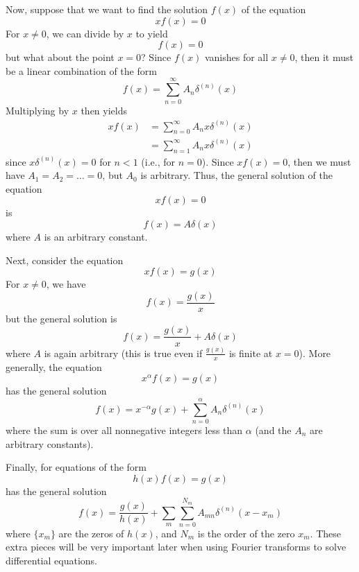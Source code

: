 Now, suppose that we want to find the solution $f(x)$ of the equation
\begin{equation*}
  x f(x) = 0
\end{equation*}
For $x \neq 0$, we can divide by $x$ to yield
\begin{equation*}
  f(x) = 0
\end{equation*}
but what about the point $x = 0$?  Since $f(x)$ vanishes for all $x \neq 0$,
then it must be a linear combination of the form
\begin{equation*}
  f(x) = \sum_{n=0}^\infty A_n \delta^{(n)}(x)
\end{equation*}
Multiplying by $x$ then yields
\begin{align*}
  x f(x) &= \sum_{n=0}^\infty A_n x \delta^{(n)}(x) \\
         &= \sum_{n=1}^\infty A_n x \delta^{(n)}(x)
\end{align*}
since $x \delta^{(n)}(x) = 0$ for $n < 1$ (i.e., for $n = 0$).  Since
$xf(x)=0$, then we must have $A_1 = A_2 = \dots = 0$, but $A_0$ is arbitrary.
Thus, the general solution of the equation
\begin{equation*}
  xf(x) = 0
\end{equation*}
is
\begin{equation*}
  f(x) = A \delta(x)
\end{equation*}
where $A$ is an arbitrary constant.

Next, consider the equation
\begin{equation*}
  xf(x) = g(x)
\end{equation*}
For $x \neq 0$, we have
\begin{equation*}
  f(x) = \frac{g(x)}{x}
\end{equation*}
but the general solution is
\begin{equation*}
  f(x) = \frac{g(x)}{x} + A \delta(x)
\end{equation*}
where $A$ is again arbitrary (this is true even if $\tfrac{g(x)}{x}$ is finite
at $x=0$).  More generally, the equation
\begin{equation*}
  x^\alpha f(x) = g(x)
\end{equation*}
has the general solution
\begin{equation*}
  f(x) = x^{-\alpha} g(x) + \sum_{n=0}^\alpha A_n \delta^{(n)}(x)
\end{equation*}
where the sum is over all nonnegative integers less than $\alpha$ (and the
$A_n$ are arbitrary constants).

Finally, for equations of the form
\begin{equation*}
  h(x) f(x) = g(x)
\end{equation*}
has the general solution
\begin{equation*}
  f(x) = \frac{g(x)}{h(x)} + \sum_m \sum_{n=0}^{N_m} A_{mn}\delta^{(n)}(x-x_m)
\end{equation*}
where $\{x_m\}$ are the zeros of $h(x)$, and $N_m$ is the order of the zero
$x_m$.  These extra pieces will be very important later when using Fourier
transforms to solve differential equations.
